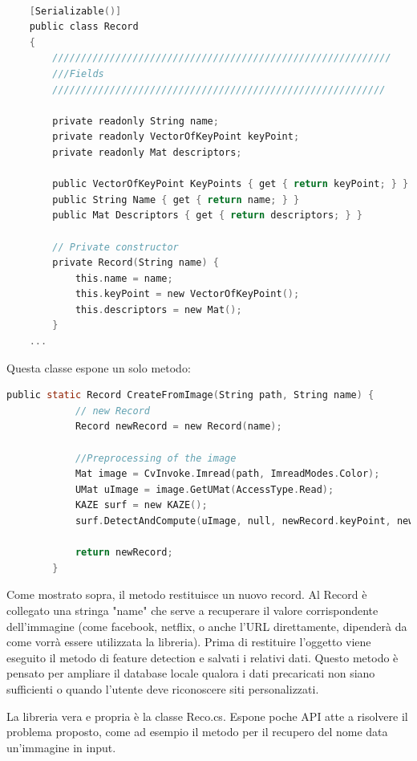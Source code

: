 \documentclass[twoside]{supsistudent}
\begin{document}
\begin{lstlisting}[language=C]

    [Serializable()]
    public class Record
    {
        ///////////////////////////////////////////////////////////
        ///Fields
        //////////////////////////////////////////////////////////

        private readonly String name;
        private readonly VectorOfKeyPoint keyPoint;
        private readonly Mat descriptors;

        public VectorOfKeyPoint KeyPoints { get { return keyPoint; } }
        public String Name { get { return name; } }
        public Mat Descriptors { get { return descriptors; } }

        // Private constructor
        private Record(String name) {
            this.name = name;
            this.keyPoint = new VectorOfKeyPoint();
            this.descriptors = new Mat();
        }
    ...
\end{lstlisting}

Questa classe espone un solo metodo:

\begin{lstlisting}[language=C]
public static Record CreateFromImage(String path, String name) {
            // new Record
            Record newRecord = new Record(name);

            //Preprocessing of the image
            Mat image = CvInvoke.Imread(path, ImreadModes.Color);
            UMat uImage = image.GetUMat(AccessType.Read);
            KAZE surf = new KAZE();
            surf.DetectAndCompute(uImage, null, newRecord.keyPoint, newRecord.descriptors, false);

            return newRecord;
        }
\end{lstlisting}

Come mostrato sopra, il metodo restituisce un nuovo record. Al Record è collegato una stringa "name" che serve a recuperare il valore corrispondente dell'immagine (come facebook, netflix, o anche l'URL direttamente, dipenderà da come vorrà essere utilizzata la libreria). Prima di restituire l'oggetto viene eseguito il metodo di feature detection e salvati i relativi dati. Questo metodo è pensato per ampliare il database locale qualora i dati precaricati non siano sufficienti o quando l'utente deve riconoscere siti personalizzati. 

La libreria vera e propria è la classe Reco.cs. Espone poche API atte a risolvere il problema proposto, come ad esempio il metodo per il recupero del nome data un'immagine in input. 
\end{document}
